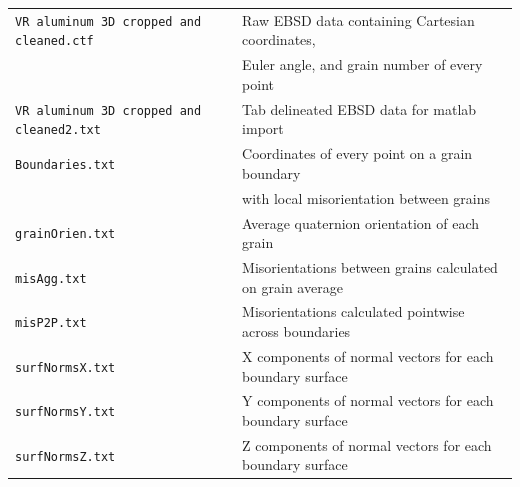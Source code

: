 \documentclass{article}
\begin{document}
\begin{center}
\begin{tabular}{l l}
\texttt{VR aluminum 3D cropped and cleaned.ctf}&Raw EBSD data containing Cartesian coordinates,\\
& Euler angle, and grain number of every point\\
\texttt{VR aluminum 3D cropped and cleaned2.txt}&Tab delineated EBSD data for {\sc matlab} import\\
\texttt{Boundaries.txt}&Coordinates of every point on a grain boundary\\
& with local misorientation between grains\\
\texttt{grainOrien.txt}&Average quaternion orientation of each grain\\
\texttt{misAgg.txt}&Misorientations between grains calculated on grain average\\
\texttt{misP2P.txt}&Misorientations calculated pointwise across boundaries\\
\texttt{surfNormsX.txt}&X components of normal vectors for each boundary surface\\
\texttt{surfNormsY.txt}&Y components of normal vectors for each boundary surface\\
\texttt{surfNormsZ.txt}&Z components of normal vectors for each boundary surface\\
\end{tabular}
\end{center}
\end{document}
